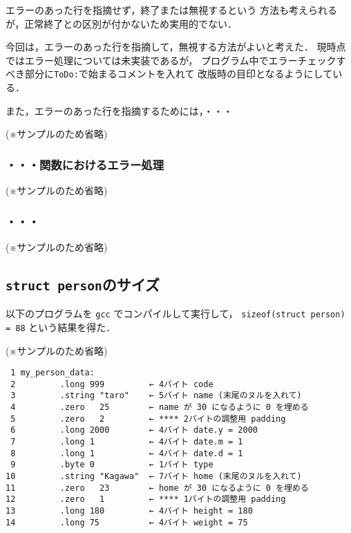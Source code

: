 \documentclass[a4j,11pt]{jarticle}
\begin{document}
エラーのあった行を指摘せず，終了または無視するという
方法も考えられるが，正常終了との区別が付かないため実用的でない．

今回は，エラーのあった行を指摘して，無視する方法がよいと考えた．
現時点ではエラー処理については未実装であるが，
プログラム中でエラーチェックすべき部分に\verb|ToDo:|で始まるコメントを入れて
改版時の目印となるようにしている．

また，エラーのあった行を指摘するためには，・・・

(※サンプルのため省略)

\subsubsection{・・・関数におけるエラー処理}

(※サンプルのため省略)

\subsubsection{・・・}

(※サンプルのため省略)


\subsection{\texttt{struct person}のサイズ}

以下のプログラムを \verb|gcc| でコンパイルして実行して，
\verb|sizeof(struct person) = 88| という結果を得た．

(※サンプルのため省略)

{\fontsize{10pt}{11pt} \selectfont
 \begin{verbatim}
 1 my_person_data:
 2         .long 999         ← 4バイト code
 3         .string "taro"    ← 5バイト name (末尾のヌルを入れて)
 4         .zero   25        ← name が 30 になるように 0 を埋める
 5         .zero   2         ← **** 2バイトの調整用 padding
 6         .long 2000        ← 4バイト date.y = 2000
 7         .long 1           ← 4バイト date.m = 1
 8         .long 1           ← 4バイト date.d = 1
 9         .byte 0           ← 1バイト type
10         .string "Kagawa"  ← 7バイト home (末尾のヌルを入れて)
11         .zero   23        ← home が 30 になるように 0 を埋める
12         .zero   1         ← **** 1バイトの調整用 padding
13         .long 180         ← 4バイト height = 180
14         .long 75          ← 4バイト weight = 75
 \end{verbatim}
}
\end{document}
